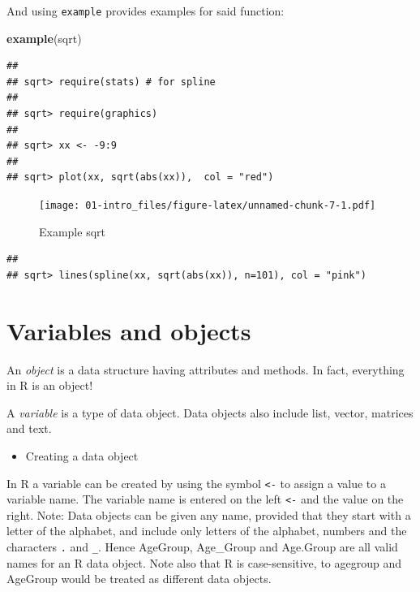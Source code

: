 \documentclass[]{book}
\newenvironment{Shaded}{\begin{snugshade}}{\end{snugshade}}
\newcommand{\KeywordTok}[1]{\textcolor[rgb]{0.13,0.29,0.53}{\textbf{#1}}}
\newcommand{\NormalTok}[1]{#1}
\providecommand{\tightlist}{%
  \setlength{\itemsep}{0pt}\setlength{\parskip}{0pt}}
\begin{document}
And using \texttt{example} provides examples for said function:

\begin{Shaded}
\begin{Highlighting}[]
\KeywordTok{example}\NormalTok{(sqrt)}
\end{Highlighting}
\end{Shaded}

\begin{verbatim}
## 
## sqrt> require(stats) # for spline
## 
## sqrt> require(graphics)
## 
## sqrt> xx <- -9:9
## 
## sqrt> plot(xx, sqrt(abs(xx)),  col = "red")
\end{verbatim}

\begin{figure}
\centering
\texttt{[image: 01-intro\_files/figure-latex/unnamed-chunk-7-1.pdf]}
\caption{\label{fig:unnamed-chunk-7}Example sqrt}
\end{figure}

\begin{verbatim}
## 
## sqrt> lines(spline(xx, sqrt(abs(xx)), n=101), col = "pink")
\end{verbatim}

\hypertarget{variables-and-objects}{%
\section{Variables and objects}\label{variables-and-objects}}

An \emph{object} is a data structure having attributes and methods. In fact, everything in R is an object!

A \emph{variable} is a type of data object. Data objects also include list, vector, matrices and text.

\begin{itemize}
\tightlist
\item
  Creating a data object
\end{itemize}

In R a variable can be created by using the symbol \texttt{\textless{}-} to assign a value to a variable name. The variable name is entered on the left \texttt{\textless{}-} and the value on the right. Note: Data objects can be given any name, provided that they start with a letter of the alphabet, and include only letters of the alphabet, numbers and the characters \texttt{.} and \texttt{\_}. Hence AgeGroup, Age\_Group and Age.Group are all valid names for an R data object. Note also that R is case-sensitive, to agegroup and AgeGroup would be treated as different data objects.
\end{document}

